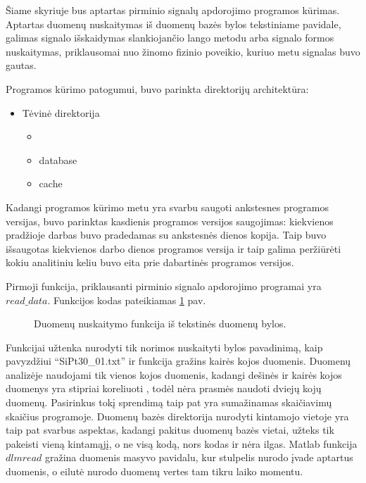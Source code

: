 \documentclass[]{vgtuef}
\begin{document}
Šiame skyriuje bus aptartas pirminio signalų apdorojimo programos kūrimas. Aptartas duomenų nuskaitymas iš duomenų bazės bylos tekstiniame pavidale, galimas signalo išskaidymas slankiojančio lango metodu arba signalo formos nuskaitymas, priklausomai nuo žinomo fizinio poveikio, kuriuo metu signalas buvo gautas.

Programos kūrimo patogumui, buvo parinkta direktorijų architektūra:

\begin{itemize}
\item Tėvinė direktorija
  \begin{itemize}
  \item <programos versija, nurodyta datos formatu>
  \item database
  \item cache
  \end{itemize}
\end{itemize}

Kadangi programos kūrimo metu yra svarbu saugoti ankstesnes programos versijas, buvo parinktas kasdienis programos versijos saugojimas: kiekvienos pradžioje darbas buvo pradedamas su ankstesnės dienos kopija. Taip buvo išsaugotas kiekvienos darbo dienos programos versija ir taip galima peržiūrėti kokiu analitiniu keliu buvo eita prie dabartinės programos versijos.

Pirmoji funkcija, priklausanti pirminio signalo apdorojimo programai yra $read\_data$. Funkcijos kodas pateikiamas \ref{code:read_data} pav.

\begin{figure}[t]
  \centering
  
  \caption{Duomenų nuskaitymo funkcija iš tekstinės duomenų bylos.}
  \label{code:read_data}
\end{figure}

Funkcijai užtenka nurodyti tik norimos nuskaityti bylos pavadinimą, kaip pavyzdžiui ``SiPt30\_01.txt'' ir funkcija gražins kairės kojos duomenis. Duomenų analizėje naudojami tik vienos kojos duomenis, kadangi dešinės ir kairės kojos duomenys yra stipriai koreliuoti \cite{16053531}, todėl nėra prasmės naudoti dviejų kojų duomenų. Pasirinkus tokį sprendimą taip pat yra sumažinamas skaičiavimų skaičius programoje. Duomenų bazės direktorija nurodyti kintamojo vietoje yra taip pat svarbus aspektas, kadangi pakitus duomenų bazės vietai, užteks tik pakeisti vieną kintamąjį, o ne visą kodą, nors kodas ir nėra ilgas. Matlab funkcija $dlmread$ gražina duomenis masyvo pavidalu, kur stulpelis nurodo įvade aptartus duomenis, o eilutė nurodo duomenų vertes tam tikru laiko momentu.
\end{document}

